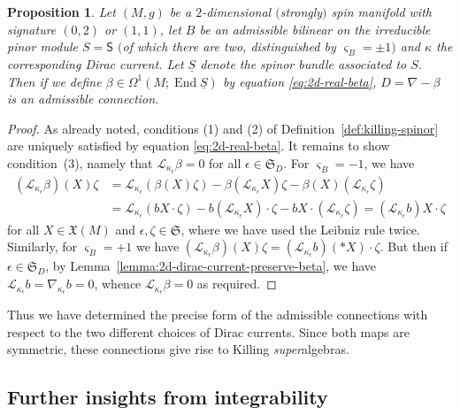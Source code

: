 \documentclass[pdftex]{sigma}
\numberwithin{equation}{section}
\newtheorem{Proposition}[Theorem]{Proposition}
 { \theoremstyle{definition}
\newtheorem{Definition}[Theorem]{Definition}
\newtheorem{Note}[Theorem]{Note}
\newtheorem{Example}[Theorem]{Example}
\newtheorem{Remark}[Theorem]{Remark} }
\newcommand{\fX}{\mathfrak{X}}
\newcommand{\fS}{\mathfrak{S}}
\newcommand{\eL}{\mathscr{L}}
\newcommand{\ssS}{\mathsf{S}}
\newcommand{\Sbundle}{\underline{S}}
\newcommand{\1}{\mathbbm{1}}
\DeclareMathOperator{\End}{End}
\begin{document}
\begin{Proposition}\label{prop:2d-real-KSA-exist}
	Let $(M,g)$ be a $2$-dimensional $($strongly$)$ spin manifold with signature $(0,2)$ or $(1,1)$, let $B$ be an admissible bilinear on the irreducible pinor module $S=\ssS$ $($of which there are two, distinguished by $\varsigma_B=\pm 1$$)$ and $\kappa$ the corresponding Dirac current. Let $\Sbundle$ denote the spinor bundle associated to $S$. Then if we define $\beta\in\Omega^1(M;\End\Sbundle)$ by equation \eqref{eq:2d-real-beta}, $D=\nabla-\beta$ is an admissible connection.
\end{Proposition}

\begin{proof}
	As already noted, conditions (1) and (2) of Definition~\ref{def:killing-spinor} are uniquely satisfied by equation \eqref{eq:2d-real-beta}. It remains to show condition~(3), namely that $\eL_{\kappa_\epsilon}\beta=0$ for all $\epsilon\in\fS_D$. For $\varsigma_B=-1$, we have
	\begin{align*}
		(\eL_{\kappa_\epsilon}\beta)(X)\zeta
			&= \eL_{\kappa_\epsilon}(\beta(X)\zeta) - \beta(\eL_{\kappa_\epsilon}X)\zeta - \beta(X)(\eL_{\kappa_\epsilon}\zeta)	\\
			&= \eL_{\kappa_\epsilon}(bX\cdot\zeta) - b(\eL_{\kappa_\epsilon}X)\cdot\zeta - bX\cdot (\eL_{\kappa_\epsilon}\zeta)	= (\eL_{\kappa_\epsilon}b)X\cdot\zeta	
	\end{align*}
	for all $X\in\fX(M)$ and $\epsilon,\zeta\in\fS$, where we have used the Leibniz rule twice. Similarly, for $\varsigma_B=+1$ we have $(\eL_{\kappa_\epsilon}\beta)(X)\zeta= (\eL_{\kappa_\epsilon}b)(*X)\cdot\zeta$. But then if $\epsilon\in\fS_D$, by Lemma~\ref{lemma:2d-dirac-current-preserve-beta}, we have $\eL_{\kappa_\epsilon}b=\nabla_{\kappa_\epsilon}b=0$, whence $\eL_{\kappa_\epsilon}\beta=0$ as required.
\end{proof}

Thus we have determined the precise form of the admissible connections with respect to the two different choices of Dirac currents. Since both maps are symmetric, these connections give rise to Killing \emph{super}algebras.

\subsection{Further insights from integrability}
\end{document}
